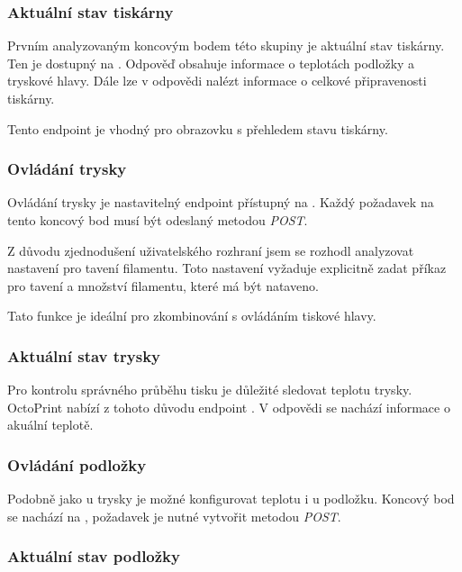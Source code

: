 \subsubsection*{Aktuální stav tiskárny}

Prvním analyzovaným koncovým bodem této skupiny je aktuální stav tiskárny.
Ten je dostupný na .
Odpověď obsahuje informace o teplotách podložky a tryskové hlavy.
Dále lze v odpovědi nalézt informace o celkové připravenosti tiskárny.

Tento endpoint je vhodný pro obrazovku s přehledem stavu tiskárny.

\subsubsection*{Ovládání trysky}

Ovládání trysky je nastavitelný endpoint přístupný na .
Každý požadavek na tento koncový bod musí být odeslaný metodou \textit{POST}.

Z důvodu zjednodušení uživatelského rozhraní jsem se rozhodl analyzovat nastavení pro tavení filamentu.
Toto nastavení vyžaduje explicitně zadat příkaz pro tavení a množství filamentu, které má být nataveno.

Tato funkce je ideální pro zkombinování s ovládáním tiskové hlavy.

\subsubsection*{Aktuální stav trysky}

Pro kontrolu správného průběhu tisku je důležité sledovat teplotu trysky.
OctoPrint nabízí z tohoto důvodu endpoint .
V odpovědi se nachází informace o akuální teplotě.

\subsubsection*{Ovládání podložky}

Podobně jako u trysky je možné konfigurovat teplotu i u podložku.
Koncový bod se nachází na , požadavek je nutné vytvořit metodou \textit{POST}.

\subsubsection*{Aktuální stav podložky}

